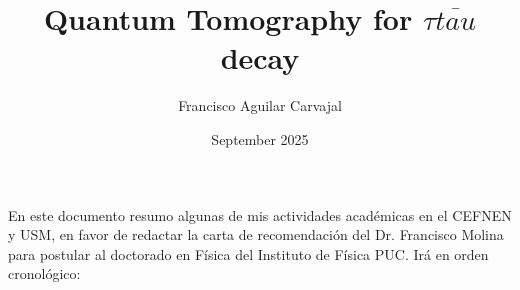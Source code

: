 \documentclass{article}
\title{Quantum Tomography for $\tau \overline{tau}$ decay}
\author{Francisco Aguilar Carvajal}
\date{September 2025}
\begin{document}
\maketitle

En este documento resumo algunas de mis actividades académicas en el CEFNEN y USM, en favor de redactar la carta de recomendación del Dr. Francisco Molina para postular al doctorado en Física del Instituto de Física PUC. Irá en orden cronológico:
\end{document}
